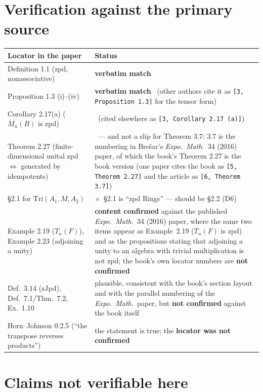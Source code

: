 \documentclass[11pt,a4paper]{article}
\newcommand{\yes}{\checkmark}
\newcommand{\no}{$\times$}
\newcommand{\cpt}[1]{\texttt{#1}}          %
\begin{document}
\section{Verification against the primary source}
\label{sec:primary}

\begin{center}\small
\begin{tabular}{@{}L{0.40\textwidth}L{0.51\textwidth}@{}}
\toprule
\textbf{Locator in the paper} & \textbf{Status}\\
\midrule
Definition 1.1 (zpd, nonassociative) & \textbf{verbatim match} \yes\\
Proposition 1.3 (i)--(iv) & \textbf{verbatim match} \yes\ (other authors cite it as \cpt{[3, Proposition 1.3]}
  for the tensor form)\\
Corollary 2.17(a) ($M_n(B)$ is zpd) & \yes\ (cited elsewhere as \cpt{[3, Corollary 2.17 (a)]})\\
Theorem 2.27 (finite-dimensional unital zpd $\iff$ generated by idempotents) & \yes\ --- and not a slip
  for Theorem 3.7: 3.7 is the numbering in Bre\v{s}ar's \emph{Expo.\ Math.}\ 34 (2016) paper, of which
  the book's Theorem 2.27 is the book version (one paper cites the book as \cpt{[5, Theorem 2.27]} and
  the article as \cpt{[6, Theorem 3.7]})\\
\S2.1 for $\mathrm{Tri}(A_1,M,A_2)$ & \no\ \S2.1 is ``zpd Rings'' --- should be \S2.2 (D6)\\
Example 2.19 ($T_n(F)$), Example 2.23 (adjoining a unity) & \textbf{content confirmed} against the
  published \emph{Expo.\ Math.}\ 34 (2016) paper, where the same two items appear as Example~2.19
  ($T_n(F)$ is zpd) and as the propositions stating that adjoining a unity to an algebra with trivial
  multiplication is not zpd; the book's own locator numbers are \textbf{not confirmed}\\
Def.~3.14 (zJpd), Def.~7.1/Thm.~7.2, Ex.~1.10 & plausible, consistent with the book's section layout and
  with the parallel numbering of the \emph{Expo.\ Math.}\ paper, but \textbf{not confirmed} against the
  book itself\\
Horn--Johnson 0.2.5 (``the transpose reverses products'') & the statement is true; the \textbf{locator was
  not confirmed}\\
\bottomrule
\end{tabular}
\end{center}

\section{Claims not verifiable here}
\label{sec:unverifiable}
\end{document}
